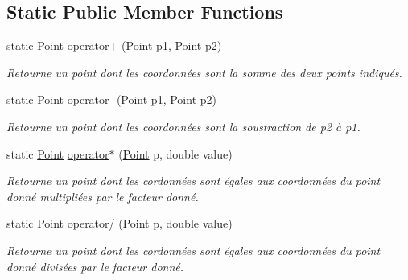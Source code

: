 \subsection*{Static Public Member Functions}
\begin{DoxyCompactItemize}
\item 
static \hyperlink{class_tentacle_slicers_1_1general_1_1_point}{Point} \hyperlink{class_tentacle_slicers_1_1general_1_1_point_aa3a4315cd28f6c91a471120f5e45869c}{operator+} (\hyperlink{class_tentacle_slicers_1_1general_1_1_point}{Point} p1, \hyperlink{class_tentacle_slicers_1_1general_1_1_point}{Point} p2)
\begin{DoxyCompactList}\small\item\em Retourne un point dont les coordonnées sont la somme des deux points indiqués. \end{DoxyCompactList}\item 
static \hyperlink{class_tentacle_slicers_1_1general_1_1_point}{Point} \hyperlink{class_tentacle_slicers_1_1general_1_1_point_a6dfc5efa00ae6d581418027b22b4d3ed}{operator-\/} (\hyperlink{class_tentacle_slicers_1_1general_1_1_point}{Point} p1, \hyperlink{class_tentacle_slicers_1_1general_1_1_point}{Point} p2)
\begin{DoxyCompactList}\small\item\em Retourne un point dont les coordonnées sont la soustraction de p2 à p1. \end{DoxyCompactList}\item 
static \hyperlink{class_tentacle_slicers_1_1general_1_1_point}{Point} \hyperlink{class_tentacle_slicers_1_1general_1_1_point_a56d010f0b60368b82de8cbb7b78116e8}{operator$\ast$} (\hyperlink{class_tentacle_slicers_1_1general_1_1_point}{Point} p, double value)
\begin{DoxyCompactList}\small\item\em Retourne un point dont les cordonnées sont égales aux coordonnées du point donné multipliées par le facteur donné. \end{DoxyCompactList}\item 
static \hyperlink{class_tentacle_slicers_1_1general_1_1_point}{Point} \hyperlink{class_tentacle_slicers_1_1general_1_1_point_afbbd8d74146828a2dceb4aa1c47752a3}{operator/} (\hyperlink{class_tentacle_slicers_1_1general_1_1_point}{Point} p, double value)
\begin{DoxyCompactList}\small\item\em Retourne un point dont les cordonnées sont égales aux coordonnées du point donné divisées par le facteur donné. \end{DoxyCompactList}\item 

\end{DoxyCompactItemize}
